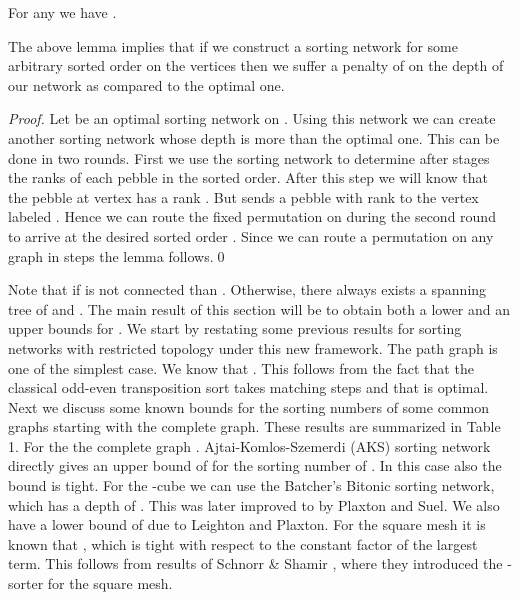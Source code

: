 \documentclass[runningheads,a4paper]{llncs}
\begin{document}
\begin{lemma}
For any  we have .
\end{lemma}

\noindent The above lemma implies that if we construct a sorting network for some arbitrary sorted order on the vertices then we suffer a penalty of  on the depth of our network as compared to the optimal one. 
\begin{proof}
	Let  be an optimal sorting network on . Using this network we can create another sorting network  whose depth is  more than the optimal one. This can be done in two rounds. First we use the sorting network  to determine after  stages the ranks of each pebble in the sorted order. After this step we will know that the pebble at vertex  has a rank . But  sends a pebble with rank  to the vertex labeled . Hence we can route the fixed permutation  on  during the second round to arrive at the desired sorted order . Since we can route a permutation on any graph in  steps the lemma follows.\qed

\end{proof}

\noindent Note that if  is not connected than . Otherwise, there always exists a spanning tree  of  and . The main result of this section will be to obtain both a lower and an upper bounds for . We start by restating some previous results for sorting networks with restricted topology under this new framework. The path graph  is one of the simplest case. We know that . This follows from the fact that the classical odd-even transposition sort takes  matching steps and that is optimal. Next we discuss some known bounds for the sorting numbers of some common graphs starting with the complete graph. These results are summarized in Table 1. For the the complete graph . Ajtai-Komlos-Szemerdi (AKS) sorting network directly gives an upper bound of  for the sorting number of . In this case also the bound is tight. For the  -cube  we can use the Batcher's Bitonic sorting network, which has a depth of  \cite{2}. This was later improved to  by Plaxton and Suel\cite{11}.  We also have a lower bound of  due to Leighton and Plaxton. For the square mesh  it is known that , which is tight with respect to the constant factor of the largest term. This follows from results of Schnorr \& Shamir \cite{4}, where they introduced the -sorter for the square mesh.
\end{document}
